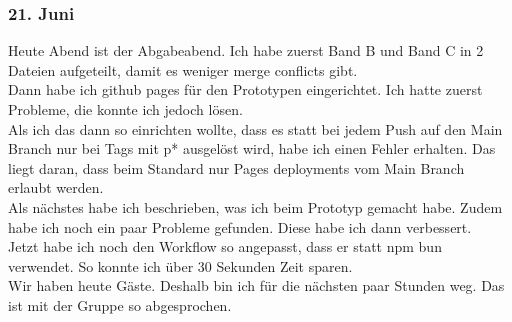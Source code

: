 \documentclass[10pt]{article}
\begin{document}
	\subsubsection{21. Juni}
	Heute Abend ist der Abgabeabend. Ich habe zuerst Band B und Band C in 2 Dateien aufgeteilt, damit es weniger merge conflicts gibt.\\
	Dann habe ich github pages für den Prototypen eingerichtet. Ich hatte zuerst Probleme, die konnte ich jedoch lösen.\\
	Als ich das dann so einrichten wollte, dass es statt bei jedem Push auf den Main Branch nur bei Tags mit p* ausgelöst wird, habe ich einen Fehler erhalten. Das liegt daran, dass beim Standard nur Pages deployments vom Main Branch erlaubt werden.\\
	Als nächstes habe ich beschrieben, was ich beim Prototyp gemacht habe. Zudem habe ich noch ein paar Probleme gefunden. Diese habe ich dann verbessert.\\
	Jetzt habe ich noch den Workflow so angepasst, dass er statt npm bun verwendet. So konnte ich über 30 Sekunden Zeit sparen.\\
	Wir haben heute Gäste. Deshalb bin ich für die nächsten paar Stunden weg. Das ist mit der Gruppe so abgesprochen.
	
\end{document}
